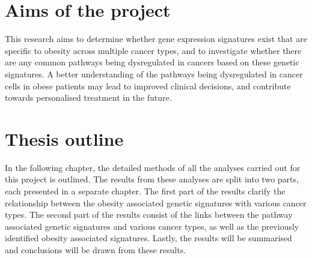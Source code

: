\vspace{-2mm}

\section{Aims of the project}
\label{sec:aim}

This research aims to determine whether gene expression signatures exist  that are specific to obesity across multiple cancer types, and to investigate whether there are any common pathways being dysregulated in cancers based on these genetic signatures.
A better understanding of the pathways being dysregulated in cancer cells in obese patients may lead to improved clinical decisions, and contribute towards personalised treatment in the future.

\section{Thesis outline}
\label{sec:thesis_outline}

In the following chapter, the detailed methods of all the analyses carried out for this project is outlined.
The results from these analyses are split into two parts, each presented in a separate chapter.
The first part of the results clarify the relationship between the obesity associated genetic signatures with various cancer types.
The second part of the results consist of the links between the pathway associated genetic signatures and various cancer types, as well as the previously identified obesity associated signatures.
Lastly, the results will be summarised and conclusions will be drawn from these results.
